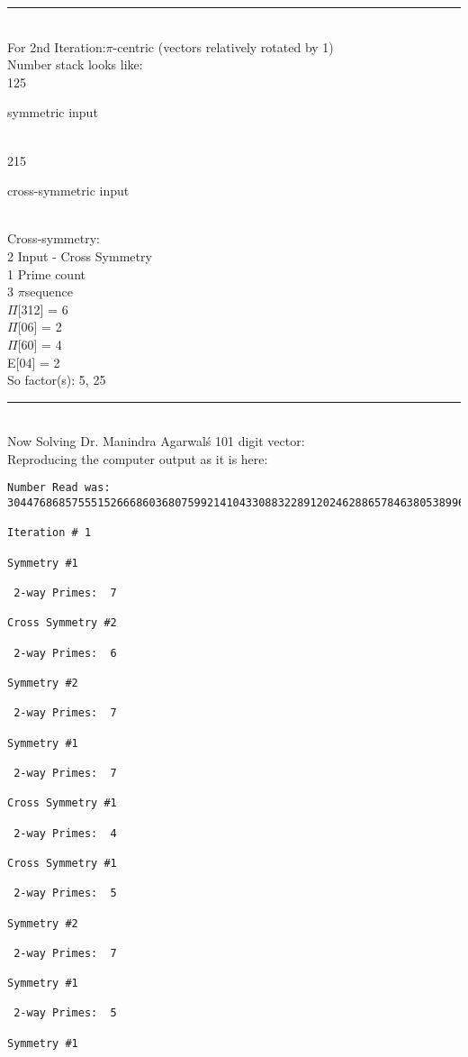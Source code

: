 \noindent\rule{8cm}{0.4pt}
\\
For 2nd Iteration:$\pi$-centric (vectors relatively rotated by 1) \\
Number stack looks like:\\
125 {symmetric input{\\
215 {cross-symmetric input{\\

Cross-symmetry:\\ 
2  {Input - Cross Symmetry}\\
1  {Prime count}\\
3  {$\pi$\-sequence}\\

$\Pi$[312] = 6\\
$\Pi$[06] = 2\\
$\Pi$[60] = 4\\
E[04] = 2\\

So factor(s): 5, 25\\

\noindent\rule{8cm}{0.4pt}
\\
Now Solving Dr. Manindra Agarwal\'s 101 digit vector:\\
Reproducing the computer output as it is here:\\

\begin{verbatim}
Number Read was: 	30447686857555152666860368075992141043308832289120246288657846380538996794608835958544046240163340857

Iteration #	1

Symmetry #1

 2-way Primes: 	7

Cross Symmetry #2

 2-way Primes: 	6

Symmetry #2

 2-way Primes: 	7

Symmetry #1

 2-way Primes: 	7

Cross Symmetry #1

 2-way Primes: 	4

Cross Symmetry #1

 2-way Primes: 	5

Symmetry #2

 2-way Primes: 	7

Symmetry #1

 2-way Primes: 	5

Symmetry #1


\end{verbatim}}}}}
